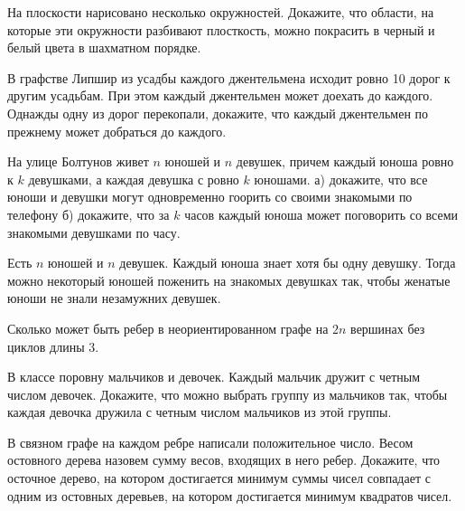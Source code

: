 \setcounter{curtask}{35}


\begin{task}
    На плоскости нарисовано несколько окружностей. Докажите, что области, на которые
    эти окружности разбивают плосткость, можно покрасить в черный и белый цвета в
    шахматном порядке.
\end{task}

\begin{task}
    В графстве Липшир из усадбы каждого джентельмена исходит ровно 10 дорог к другим
    усадьбам. При этом каждый джентельмен может доехать до каждого. Однажды одну из
    дорог перекопали, докажите, что каждый джентельмен по прежнему может добраться до
    каждого. 
\end{task}

\begin{task}
    На улице Болтунов живет $n$ юношей и $n$ девушек, причем каждый юноша ровно к $k$
    девушками, а каждая девушка с ровно $k$ юношами. а) докажите, что все юноши и
    девушки могут одновременно гоорить со своими знакомыми по телефону б) докажите,
    что за $k$ часов каждый юноша может поговорить со всеми знакомыми девушками по
    часу.
\end{task}

\begin{task}
    Есть $n$ юношей и $n$ девушек. Каждый юноша знает хотя бы одну девушку. Тогда
    можно некоторый юношей поженить на знакомых девушках так, чтобы женатые юноши не
    знали незамужних девушек.
\end{task}

\breakline

\begin{ptask}{32}
    Сколько может быть ребер в неориентированном графе на $2n$ вершинах без циклов
    длины $3$.
\end{ptask}

\begin{ptask}{33}
    В классе поровну мальчиков и девочек. Каждый мальчик дружит с четным числом
    девочек. Докажите, что можно выбрать группу из мальчиков так, чтобы каждая
    девочка дружила с четным числом мальчиков из этой группы.
\end{ptask}

\begin{ptask}{34}
    В связном графе на каждом ребре написали положительное число. Весом остовного
    дерева назовем сумму весов, входящих в него ребер. Докажите, что осточное дерево,
    на котором достигается минимум суммы чисел совпадает с одним из остовных
    деревьев, на котором достигается минимум квадратов чисел.
\end{ptask}